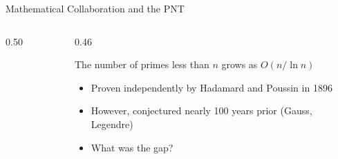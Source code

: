\documentclass{beamer}
\begin{document}
\begin{frame}{Mathematical Collaboration and the PNT}


\begin{columns}[T]
\begin{column}{0.50\textwidth}
\begin{figure}
\end{figure}
\end{column}
\begin{column}{0.46\textwidth}
\vspace{1em}
\begin{theorem}
    The number of primes less than $n$ grows as $O(n / \ln n)$
\end{theorem}
\begin{itemize}
    \item Proven independently by Hadamard and Poussin in 1896
    \item However, conjectured nearly 100 years prior (Gauss, Legendre)
    \item What was the gap?
\end{itemize}


\end{column}
\end{columns}

\end{frame}
\end{document}
